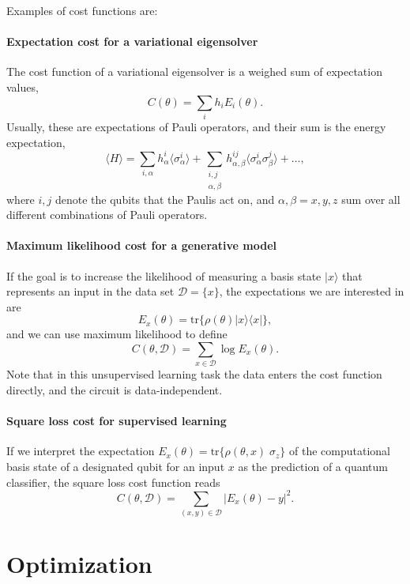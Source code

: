 \documentclass[amsmath,amssymb,aps,pra,10pt,twocolumn,groupedaddress,nofootinbib]{revtex4-1}
\newcommand{\ket}[1]{| #1 \rangle} %
\newcommand{\ketbra}[2]{|#1\rangle\langle#2|}
\newcommand{\tr}{\mathrm{tr}}
\begin{document}
\color{black!80!white}
Examples of cost functions are:

\paragraph{Expectation cost for a variational eigensolver}

The cost function of a variational eigensolver is a weighed sum of expectation values,
\[ C(\theta) = \sum_i h_i E_i(\theta). \]
Usually, these are expectations of Pauli operators, and their sum is the energy expectation,
\[\langle H \rangle = \sum\limits_{i, \alpha} h^i_{\alpha} \langle\sigma^i_{\alpha}\rangle + \sum\limits_{\substack{i,j\\ \alpha, \beta}} h^{ij}_{\alpha, \beta} \langle \sigma^i_{\alpha}\sigma^j_{\beta}\rangle + \hdots,\]
where $i,j$ denote the qubits that the Paulis act on, and $\alpha, \beta = x,y,z$ sum over all different combinations of Pauli operators. 

\paragraph{Maximum likelihood cost for a generative model}
If the goal is to increase the likelihood of measuring a basis state $\ket{x}$ that represents an input in the data set $\mathcal{D} = \{x\}$, the expectations we are interested in are 
\[E_x(\theta) =  \tr\{\rho(\theta) \ketbra{x}{x}  \},\]
and we can use maximum likelihood to define
\[C(\theta, \mathcal{D}) = \sum_{x \in \mathcal{D}}\log E_x(\theta) .\]
Note that in this unsupervised learning task the data enters the cost function directly, and the circuit is data-independent.


\paragraph{Square loss cost for supervised learning}
If we interpret the expectation $E_x(\theta) = \tr \{ \rho(\theta, x) \; \sigma_z \}$ of the computational basis state of a designated qubit for an input $x$ as the prediction of a quantum classifier, the square loss cost function reads 
\[ C(\theta, \mathcal{D}) = \sum_{(x,y) \in \mathcal{D}} |E_x(\theta)-y|^2. \]

\color{black}

\section{Optimization}
\end{document}
